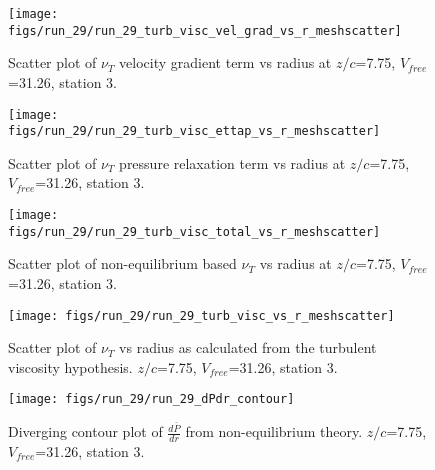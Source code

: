 \begin{figure}[H]
\centering
\texttt{[image: figs/run\_29/run\_29\_turb\_visc\_vel\_grad\_vs\_r\_meshscatter]}
\caption{Scatter plot of $\nu_T$ velocity gradient term vs radius at $z/c$=7.75, $V_{free}$=31.26, station 3.}
\end{figure}


\begin{figure}[H]
\centering
\texttt{[image: figs/run\_29/run\_29\_turb\_visc\_ettap\_vs\_r\_meshscatter]}
\caption{Scatter plot of $\nu_T$ pressure relaxation term vs radius at $z/c$=7.75, $V_{free}$=31.26, station 3.}
\end{figure}


\begin{figure}[H]
\centering
\texttt{[image: figs/run\_29/run\_29\_turb\_visc\_total\_vs\_r\_meshscatter]}
\caption{Scatter plot of non-equilibrium based $\nu_T$ vs radius at $z/c$=7.75, $V_{free}$=31.26, station 3.}
\end{figure}


\begin{figure}[H]
\centering
\texttt{[image: figs/run\_29/run\_29\_turb\_visc\_vs\_r\_meshscatter]}
\caption{Scatter plot of $\nu_T$ vs radius as calculated from the turbulent viscosity hypothesis. $z/c$=7.75, $V_{free}$=31.26, station 3.}
\end{figure}


\begin{figure}[H]
\centering
\texttt{[image: figs/run\_29/run\_29\_dPdr\_contour]}
\caption{Diverging contour plot of $\frac{d\bar{P}}{dr}$ from non-equilibrium theory. $z/c$=7.75, $V_{free}$=31.26, station 3.}
\end{figure}


